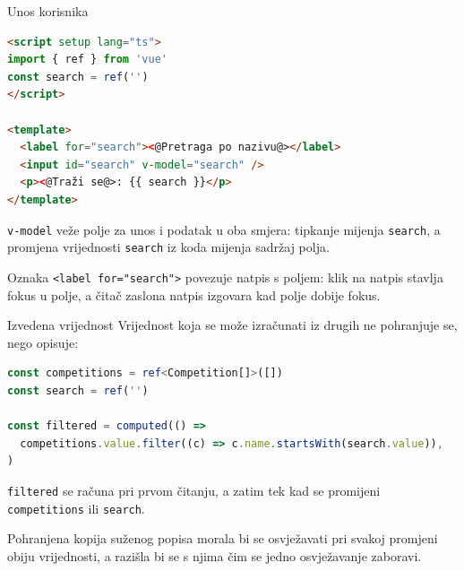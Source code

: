 \begin{frame}[fragile]{Unos korisnika}
\begin{lstlisting}[language=html]
<script setup lang="ts">
import { ref } from 'vue'
const search = ref('')
</script>

<template>
  <label for="search"><@Pretraga po nazivu@></label>
  <input id="search" v-model="search" />
  <p><@Traži se@>: {{ search }}</p>
</template>
\end{lstlisting}

\vspace{0.3em}
\texttt{v-model} veže polje za unos i podatak u oba smjera: tipkanje mijenja \texttt{search}, a promjena vrijednosti \texttt{search} iz koda mijenja sadržaj polja.

\vspace{0.3em}
Oznaka \texttt{<label for="search">} povezuje natpis s poljem: klik na natpis stavlja fokus u polje, a čitač zaslona natpis izgovara kad polje dobije fokus.
\end{frame}

\begin{frame}[fragile]{Izvedena vrijednost}
Vrijednost koja se može izračunati iz drugih ne pohranjuje se, nego opisuje:

\begin{lstlisting}[language=typescript]
const competitions = ref<Competition[]>([])
const search = ref('')

const filtered = computed(() =>
  competitions.value.filter((c) => c.name.startsWith(search.value)),
)
\end{lstlisting}

\vspace{0.3em}
\texttt{filtered} se računa pri prvom čitanju, a zatim tek kad se promijeni \texttt{competitions} ili \texttt{search}.

\vspace{0.3em}
Pohranjena kopija suženog popisa morala bi se osvježavati pri svakoj promjeni obiju vrijednosti, a razišla bi se s njima čim se jedno osvježavanje zaboravi.
\end{frame}

